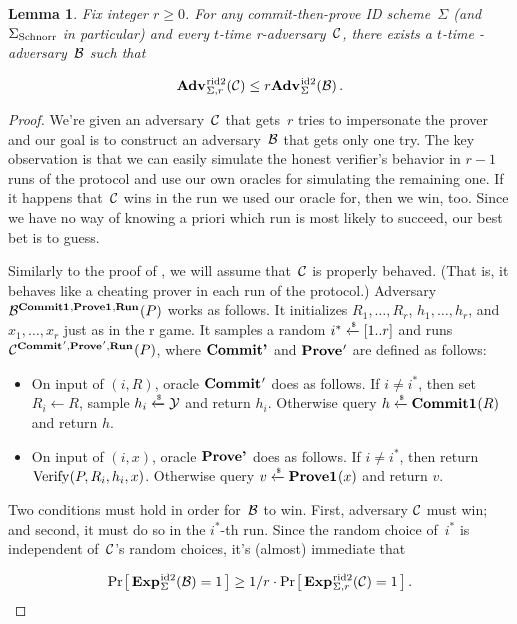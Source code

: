 \documentclass{article}
\newtheorem{lemma}{Lemma}
\theoremstyle{remark}
\begin{document}
\begin{lemma}\label{lemma:id2->rid2}
  Fix integer $r \geq 0$.
  For any commit-then-prove ID scheme~$\Sigma$ (and ${\Sigma_{\mathrm{Schnorr}}}$ in particular)
  and every $t$-time r-adversary~$\mathcal{C}$, there exists a $t$-time
  -adversary~$\mathcal{B}$ such that

  \begin{equation}
    \Adv{r\id2}_{\Sigma,r}(\C) \leq r\Adv{\id2}_{\Sigma}(\B) \,.
  \end{equation}
\end{lemma}
\begin{proof}
  We're given an adversary~$\mathcal{C}$ that gets~$r$ tries to impersonate the prover
  and our goal is to construct an adversary~$\mathcal{B}$ that gets only one try.
  The key observation is that we can easily simulate the honest verifier's
  behavior in $r-1$ runs of the protocol and use our own oracles for simulating
  the remaining one. If it happens that~$\mathcal{C}$ wins in the run we used our oracle
  for, then we win, too. Since we have no way of knowing a priori which run is most
  likely to succeed, our best bet is to guess.

  Similarly to the proof of , we will assume that~$\mathcal{C}$ is properly
  behaved. (That is, it behaves like a cheating prover in each run of the
  protocol.)
  Adversary $\mathcal{B}^{\textup{\textbf{Commit1}}\hspace{0.5pt},\textup{\textbf{Prove1}}\hspace{0.5pt},\textup{\textbf{Run}}\hspace{0.5pt}}(P)$ works as follows. It initializes
  $R_1, \ldots, R_r$, $h_1, \ldots, h_r$, and $x_1, \ldots, x_r$ just as in the
  r game.
  It samples a random $i^* \xleftarrow{\text{\tiny{\$}}} [1..r]$ and runs
  $\mathcal{C}^{\textup{\textbf{Commit}}\hspace{0.5pt}',\textup{\textbf{Prove}}\hspace{0.5pt}',\textup{\textbf{Run}}\hspace{0.5pt}}(P)$, where $\textup{\textbf{Commit'}}\hspace{0.5pt}{}$ and $\textup{\textbf{Prove}}\hspace{0.5pt}'$ are
  defined as follows:

  \begin{itemize}
    \item On input of $(i,R)$, oracle $\textup{\textbf{Commit}}\hspace{0.5pt}'$ does as follows. If $i\ne
      i^*$, then set $R_i\gets R$, sample $h_i \xleftarrow{\text{\tiny{\$}}} \mathcal{Y}$ and return $h_i$.
      Otherwise query $h \xleftarrow{\text{\tiny{\$}}} \textup{\textbf{Commit1}}\hspace{0.5pt}(R)$ and return $h$.

    \item On input of $(i,x)$, oracle $\textup{\textbf{Prove'}}\hspace{0.5pt}{}$ does as follows.
      If $i\ne i^*$, then return $\textnormal{Verify}\hspace{0.33pt}(P,R_i,h_i,x)$. Otherwise query $v
      \xleftarrow{\text{\tiny{\$}}} \textup{\textbf{Prove1}}\hspace{0.5pt}(x)$ and return $v$.
  \end{itemize}

  Two conditions must hold in order for~$\mathcal{B}$ to win. First, adversary $\mathcal{C}$ must
  win; and second, it must do so in the $i^*$-th run. Since the random choice
  of~$i^*$ is independent of~$\mathcal{C}$'s random choices, it's (almost) immediate that

  \begin{equation}
    \Prob{\Exp{\id2}_{\Sigma}(\B)=1} \geq 1/r \cdot
    \Prob{\Exp{r\id2}_{\Sigma,r}(\C)=1}
    \,.
  \end{equation}
\end{proof}
\end{document}
